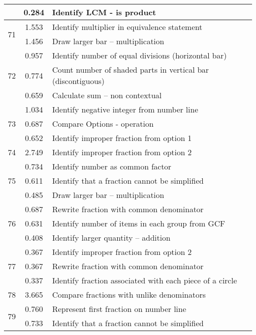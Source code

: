 \begin{longtable}[c]{|c|c|l|}
 & \small 0.284 & \small Identify LCM - is product \\
\hline
\multirow{2}{*}{\small 71} & \small 1.553 & \small Identify multiplier in equivalence statement \\
 & \small 1.456 & \small Draw larger bar -- multiplication \\
\hline
\multirow{3}{*}{\small 72} & \small 0.957 & \small Identify number of equal divisions (horizontal bar) \\
 & \small 0.774 & \small Count number of shaded parts in vertical bar (discontiguous) \\
 & \small 0.659 & \small Calculate sum -- non contextual \\
\hline
\multirow{3}{*}{\small 73} & \small 1.034 & \small Identify negative integer from number line \\
 & \small 0.687 & \small Compare Options - operation \\
 & \small 0.652 & \small Identify improper fraction from option 1 \\
\hline
\multirow{1}{*}{\small 74} & \small 2.749 & \small Identify improper fraction from option 2 \\
\hline
\multirow{3}{*}{\small 75} & \small 0.734 & \small Identify number as common factor \\
 & \small 0.611 & \small Identify that a fraction cannot be simplified \\
 & \small 0.485 & \small Draw larger bar -- multiplication \\
\hline
\multirow{3}{*}{\small 76} & \small 0.687 & \small Rewrite fraction with common denominator \\
 & \small 0.631 & \small Identify number of items in each group from GCF \\
 & \small 0.408 & \small Identify larger quantity -- addition \\
\hline
\multirow{3}{*}{\small 77} & \small 0.367 & \small Identify improper fraction from option 2 \\
 & \small 0.367 & \small Rewrite fraction with common denominator \\
 & \small 0.337 & \small Identify fraction associated with each piece of a circle \\
\hline
\multirow{1}{*}{\small 78} & \small 3.665 & \small Compare fractions with unlike denominators \\
\hline
\multirow{3}{*}{\small 79} & \small 0.760 & \small Represent first fraction on number line \\
 & \small 0.733 & \small Identify that a fraction cannot be simplified \\

\end{longtable}
